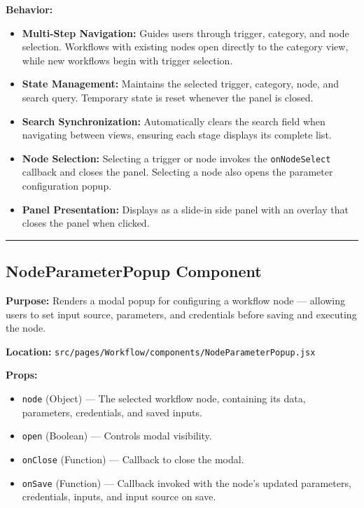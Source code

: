 \textbf{Behavior:}
\begin{itemize}
    \item \textbf{Multi-Step Navigation:} Guides users through trigger, category, and node selection. Workflows with existing nodes open directly to the category view, while new workflows begin with trigger selection.
    \item \textbf{State Management:} Maintains the selected trigger, category, node, and search query. Temporary state is reset whenever the panel is closed.
    \item \textbf{Search Synchronization:} Automatically clears the search field when navigating between views, ensuring each stage displays its complete list.
    \item \textbf{Node Selection:} Selecting a trigger or node invokes the \texttt{onNodeSelect} callback and closes the panel. Selecting a node also opens the parameter configuration popup.
    \item \textbf{Panel Presentation:} Displays as a slide-in side panel with an overlay that closes the panel when clicked.
\end{itemize}

\vfill
\hrule
\vspace{0.5cm}

\subsection*{NodeParameterPopup Component}

\textbf{Purpose:} Renders a modal popup for configuring a workflow node --- allowing users to set input source, parameters, and credentials before saving and executing the node.

\textbf{Location:} \texttt{src/pages/Workflow/components/NodeParameterPopup.jsx}

\textbf{Props:}
\begin{itemize}
    \item \texttt{node} (Object) --- The selected workflow node, containing its data, parameters, credentials, and saved inputs.
    \item \texttt{open} (Boolean) --- Controls modal visibility.
    \item \texttt{onClose} (Function) --- Callback to close the modal.
    \item \texttt{onSave} (Function) --- Callback invoked with the node's updated parameters, credentials, inputs, and input source on save.
\end{itemize}

